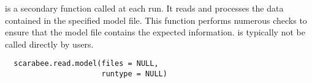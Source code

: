 %
\begin{Description}\relax
{} is a secondary function called at each 
 run. It reads and processes the data contained in the specified
model file. This function performs numerous checks to ensure that the model 
file contains the expected information.  is 
typically not be called directly by users.
\end{Description}
%
\begin{Usage}
\begin{verbatim}
  scarabee.read.model(files = NULL, 
                      runtype = NULL)
\end{verbatim}
\end{Usage}
%
